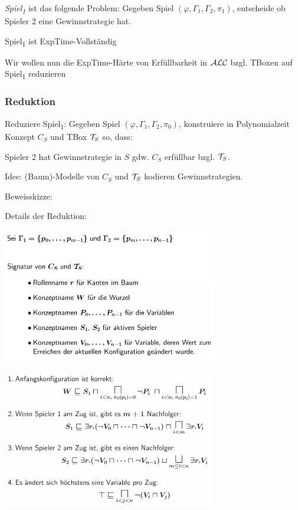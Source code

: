 \begin{definition}

\emph{Spiel\textsubscript{1}} ist das folgende Problem: Gegeben Spiel
$\left( \varphi,\Gamma_{1},\Gamma_{2},\pi_{1} \right)$, entscheide ob
Spieler 2 eine Gewinnstrategie hat.
\end{definition}

\begin{theorem}
Spiel\textsubscript{1} ist ExpTime-Vollständig
\end{theorem}

Wir wollen nun die ExpTime-Härte von Erfüllbarkeit in $\mathcal{A}\mathcal{L}\mathcal{C}$ bzgl. TBoxen auf Spiel\textsubscript{1} reduzieren

\subsubsection{Reduktion}\label{reduktion}

Reduziere Spiel\textsubscript{1}: Gegeben Spiel
$\left( \varphi,\Gamma_{1},\Gamma_{2},\pi_{0} \right)$, konstruiere in
Polynomialzeit Konzept $C_{S}$ und TBox $\mathcal{T}_{S}$ so, dass: 

\begin{lemma}Spieler 2 hat Gewinnstrategie in $S$ gdw. $C_{S}$ erfüllbar bzgl. $\mathcal{T}_{S}$.\end{lemma}

Idee: (Baum)-Modelle von $C_S$ und $\mathcal{T}_S$ kodieren Gewinnstrategien.

Beweisskizze:

Details der Reduktion:

\includegraphics[width=3.71910in,height=2.33200in]{media/5red1.png}

\includegraphics[width=3.71910in,height=2.33200in]{media/5red2.png}

